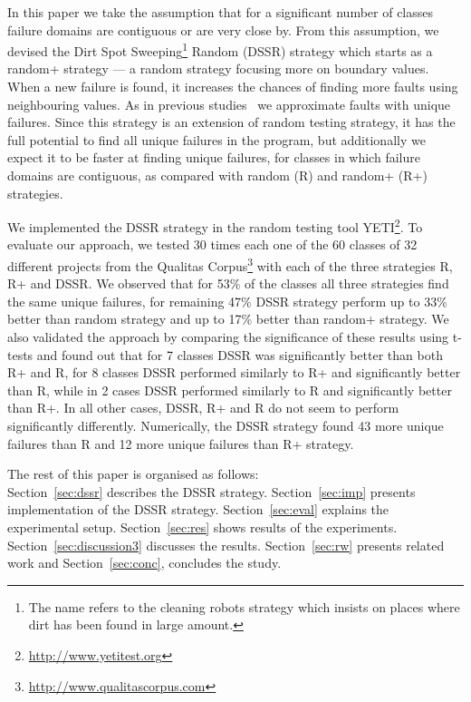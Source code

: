 In this paper we take the assumption that for a significant number of classes failure domains are contiguous or are very close by. From this assumption, we devised the Dirt Spot Sweeping\footnote{The name refers to the cleaning robots strategy which insists on places where dirt has been found in large amount.} Random (DSSR) strategy  which starts as a random+ strategy --- a random strategy focusing more on boundary values. When a new failure is found, it increases the chances of finding more faults using neighbouring values. As in previous studies~\cite{oriol2012law} we approximate faults with unique failures. Since this strategy is an extension of random testing strategy, it has the full potential to find all unique failures in the program, but additionally we expect it to be faster at finding unique failures, for classes in which failure domains are contiguous, as compared with random (R) and random+ (R+) strategies.

We implemented the DSSR strategy in the random testing tool YETI\footnote{\url{http://www.yetitest.org}}. To evaluate our approach, we tested 30 times each one of the 60 classes of 32 different projects from the Qualitas Corpus\footnote{\url{http://www.qualitascorpus.com}} with each of the three strategies R, R+ and DSSR. We observed that for 53\% of the classes all three strategies find the same unique failures, for remaining 47\% DSSR strategy perform up to 33\% better than random strategy and up to 17\% better than random+ strategy.
We also validated the approach by comparing the significance of these results using t-tests and found out that for 7 classes DSSR was significantly better than both R+ and R, for 8 classes DSSR performed similarly to R+ and significantly better than R, while in 2 cases DSSR performed similarly to R and significantly better than R+. In all other cases, DSSR, R+ and R do not seem to perform significantly differently.
Numerically, the DSSR strategy found 43 more unique failures than R and 12 more unique failures than R+ strategy. 

The rest of this paper is organised as follows: \\ Section~\ref{sec:dssr} describes the DSSR strategy. Section~\ref{sec:imp} presents implementation of the DSSR strategy. Section~\ref{sec:eval} explains the experimental setup. Section~\ref{sec:res} shows results of the experiments. Section~\ref{sec:discussion3} discusses the results. Section~\ref{sec:rw} presents related work and Section~\ref{sec:conc}, concludes the study.




